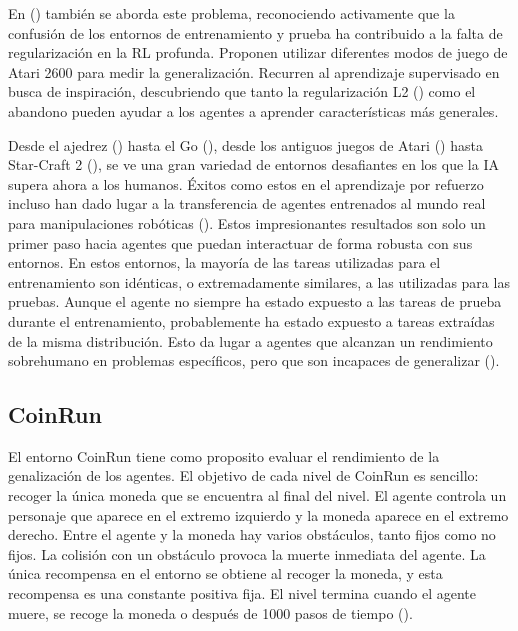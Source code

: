 En (\cite{farebrother2018generalization}) también se aborda este problema, reconociendo activamente que la confusión de los entornos de entrenamiento y prueba ha contribuido a la falta de regularización en la RL profunda. Proponen utilizar diferentes modos de juego de Atari 2600 para medir la generalización. Recurren al aprendizaje supervisado en busca de inspiración, descubriendo que tanto la regularización L2 (\cite{krogh1991simple}) como el abandono pueden ayudar a los agentes a aprender características más generales.

Desde el ajedrez (\cite{silver2017mastering}) hasta el Go (\cite{silver2016mastering}), desde los antiguos juegos de Atari (\cite{bellemare2013arcade}) hasta Star-Craft 2 (\cite{vinyals2017starcraft}), se ve una gran variedad de entornos desafiantes en los que la IA supera ahora a los humanos. Éxitos como estos en el aprendizaje por refuerzo incluso han dado lugar a la transferencia de agentes entrenados al mundo real para manipulaciones robóticas (\cite{andrychowicz2020learning}). Estos impresionantes resultados son solo un primer paso hacia agentes que puedan interactuar de forma robusta con sus entornos. En estos entornos, la mayoría de las tareas utilizadas para el entrenamiento son idénticas, o extremadamente similares, a las utilizadas para las pruebas. Aunque el agente no siempre ha estado expuesto a las tareas de prueba durante el entrenamiento, probablemente ha estado expuesto a tareas extraídas de la misma distribución. Esto da lugar a agentes que alcanzan un rendimiento sobrehumano en problemas específicos, pero que son incapaces de generalizar (\cite{packer2018assessing}).

\subsection{CoinRun}

El entorno CoinRun tiene como proposito evaluar el rendimiento de la genalización de los agentes. El objetivo de cada nivel de CoinRun es sencillo: recoger la única moneda que se encuentra al final del nivel. El agente controla un personaje que aparece en el extremo izquierdo y la moneda aparece en el extremo derecho. Entre el agente y la moneda hay varios obstáculos, tanto fijos como no fijos. La colisión con un obstáculo provoca la muerte inmediata del agente. La única recompensa en el entorno se obtiene al recoger la moneda, y esta recompensa es una constante positiva fija. El nivel termina cuando el agente muere, se recoge la moneda o después de 1000 pasos de tiempo (\cite{cobbe2019quantifying}).

